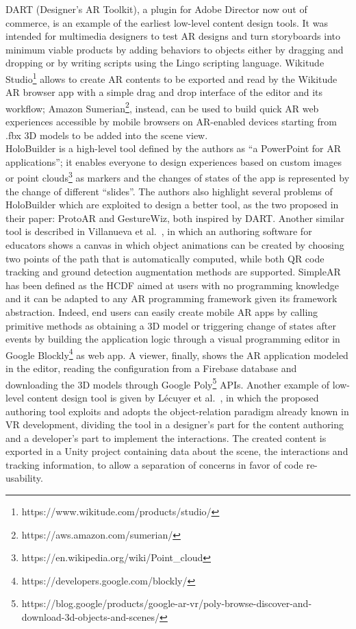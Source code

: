 DART (Designer's AR Toolkit), a plugin for Adobe Director now out of commerce, is an example of the earliest low-level content design tools. It was intended for multimedia designers to test AR designs and turn storyboards into minimum viable products by adding behaviors to objects either by dragging and dropping or by writing scripts using the Lingo scripting language. Wikitude Studio\footnote{https://www.wikitude.com/products/studio/} allows to create AR contents to be exported and read by the Wikitude AR browser app with a simple drag and drop interface of the editor and its workflow; Amazon Sumerian\footnote{https://aws.amazon.com/sumerian/}, instead, can be used to build quick AR web experiences accessible by mobile browsers on AR-enabled devices starting from .fbx 3D models to be added into the scene view.\\
HoloBuilder \cite{nebeling_trouble_2018} is a high-level tool defined by the authors as “a PowerPoint for AR applications”; it enables everyone to design experiences based on custom images or point clouds\footnote{https://en.wikipedia.org/wiki/Point\_cloud} as markers and the changes of states of the app is represented by the change of different “slides”. The authors also highlight several problems of HoloBuilder which are exploited to design a better tool, as the two proposed in their paper: ProtoAR and GestureWiz, both inspired by DART. Another similar tool is described in Villanueva et al.~\cite{villanueva_meta-ar-app_2020}, in which an authoring software for educators shows a canvas in which object animations can be created by choosing two points of the path that is automatically computed, while both QR code tracking and ground detection augmentation methods are supported.
SimpleAR has been defined as the HCDF aimed at users with no programming knowledge \cite{apaza-yllachura_simplear_2019} and it can be adapted to any AR programming framework given its framework abstraction. Indeed, end users can easily create mobile AR apps by calling primitive methods as obtaining a 3D model or triggering change of states after events by building the application logic through a visual programming editor in Google Blockly\footnote{https://developers.google.com/blockly/} as web app. A viewer, finally, shows the AR application modeled in the editor, reading the configuration from a Firebase database and downloading the 3D models through Google Poly\footnote{https://blog.google/products/google-ar-vr/poly-browse-discover-and-download-3d-objects-and-scenes/} APIs.
Another example of low-level content design tool is given by Lécuyer et al.~\cite{lecuyer_authoring_2019}, in which the proposed authoring tool exploits and adopts the object-relation paradigm already known in VR development, dividing the tool in a designer's part for the content authoring and a developer's part to implement the interactions. The created content is exported in a Unity project containing data about the scene, the interactions and tracking information, to allow a separation of concerns in favor of code re-usability.
